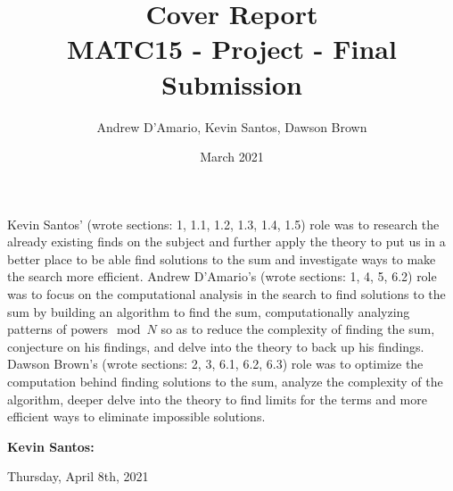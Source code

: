 \documentclass{article}
\title{Cover Report \\ \vspace{.3in} \large{MATC15 - Project - Final Submission}}
\author{Andrew D'Amario, Kevin Santos, Dawson Brown}
\date{March 2021}
\begin{document}
\maketitle

\begin{flushleft}



Kevin Santos' (wrote sections: 1, 1.1, 1.2, 1.3, 1.4, 1.5) role was to research the already existing finds on the subject and further apply the theory to put us in a better place to be able find solutions to the sum and investigate ways to make the search more efficient.
Andrew D'Amario's (wrote sections: 1, 4, 5, 6.2) role was to focus on the computational analysis in the search to find solutions to the sum by building an algorithm to find the sum, computationally analyzing patterns of powers$\mod N$ so as to reduce the complexity of finding the sum, conjecture on his findings, and delve into the theory to back up his findings.
Dawson Brown's (wrote sections: 2, 3, 6.1, 6.2, 6.3) role was to optimize the computation behind finding solutions to the sum, analyze the complexity of the algorithm, deeper delve into the theory to find limits for the terms and more efficient ways to eliminate impossible solutions.

\vspace{.5in}

{\bf Kevin Santos:}
\hspace{.63in}{\bf Dawson Brown:}
\hspace{.63in}{\bf Andrew D'Amario: }  


\vspace{1in}


Thursday, April 8th, 2021

\end{flushleft}
\end{document}
